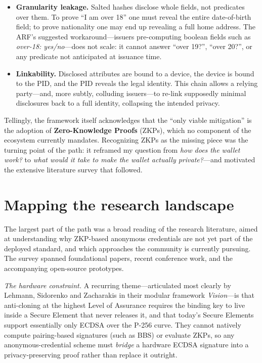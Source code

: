 \documentclass[11pt]{article}
\begin{document}
\begin{itemize}
  \item \textbf{Granularity leakage.} Salted hashes disclose whole fields, not predicates over them. To prove ``I am over 18'' one must reveal the entire date-of-birth field; to prove nationality one may end up revealing a full home address. The ARF's suggested workaround---issuers pre-computing boolean fields such as \textit{over-18: yes/no}---does not scale: it cannot answer ``over 19?'', ``over 20?'', or any predicate not anticipated at issuance time.
  \item \textbf{Linkability.} Disclosed attributes are bound to a device, the device is bound to the PID, and the PID reveals the legal identity. This chain allows a relying party---and, more subtly, colluding issuers---to re-link supposedly minimal disclosures back to a full identity, collapsing the intended privacy.
\end{itemize}

\noindent Tellingly, the framework itself acknowledges that the ``only viable mitigation'' is the adoption of \textbf{Zero-Knowledge Proofs} (ZKPs), which no component of the ecosystem currently mandates. Recognizing ZKPs as the missing piece was the turning point of the path: it reframed my question from \textit{how does the wallet work?} to \textit{what would it take to make the wallet actually private?}---and motivated the extensive literature survey that followed.

\section{Mapping the research landscape}
The largest part of the path was a broad reading of the research literature, aimed at understanding why ZKP-based anonymous credentials are not yet part of the deployed standard, and which approaches the community is currently pursuing. The survey spanned foundational papers, recent conference work, and the accompanying open-source prototypes.

\emph{The hardware constraint.} A recurring theme---articulated most clearly by Lehmann, Sidorenko and Zacharakis in their modular framework \textit{Vision}---is that anti-cloning at the highest Level of Assurance requires the binding key to live inside a Secure Element that never releases it, and that today's Secure Elements support essentially only ECDSA over the P-256 curve. They cannot natively compute pairing-based signatures (such as BBS) or evaluate ZKPs, so any anonymous-credential scheme must \emph{bridge} a hardware ECDSA signature into a privacy-preserving proof rather than replace it outright.
\end{document}
